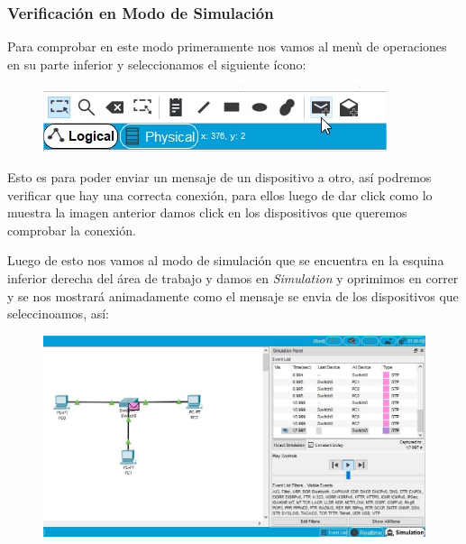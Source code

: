 \documentclass[journal]{IEEEtran}
\begin{document}
	\subsubsection{Verificación en Modo de Simulación}
	Para comprobar en este modo primeramente nos vamos al menù de operaciones en su parte inferior y seleccionamos el siguiente ícono:
	\begin{figure}[ht]
		\centering
		\includegraphics[scale=0.5]{pt_mensaje.jpg}
	\end{figure}
	Esto es para poder enviar un mensaje de un dispositivo a otro, así podremos verificar que hay una correcta conexión, para ellos luego de dar click como lo muestra la imagen anterior damos click en los dispositivos que queremos comprobar la conexión. \newline
	
	Luego de esto nos vamos al modo de simulación que se encuentra en la esquina inferior derecha del área de trabajo y damos en \textit{Simulation} y oprimimos en correr y se nos mostrará animadamente como el mensaje se envia de los dispositivos que seleccinoamos, así:
	\begin{figure}[ht]
		\centering
		\includegraphics[scale=0.35]{pt_ver_simulation.jpg}
	\end{figure}
	
\end{document}
